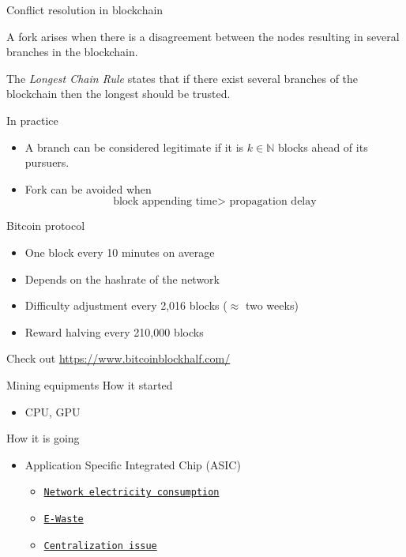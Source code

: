 \documentclass{beamer}
\begin{document}
\begin{frame}{Conflict resolution in blockchain}
\begin{tcolorbox}[enhanced,drop shadow, title=Fork]
    A fork arises when there is a disagreement between the nodes resulting in several branches in the blockchain.
\end{tcolorbox}
\begin{tcolorbox}[enhanced,drop shadow, title=LCR]
    The \textit{Longest Chain Rule} states that if there exist several branches of the blockchain then the longest should be trusted.
\end{tcolorbox}
In practice 
\begin{itemize}
  \item A branch can be considered legitimate if it is $k\in\mathbb{N}$ blocks ahead of its pursuers.
  \item Fork can be avoided when
  $$
  \text{block appending time}> \text{ propagation delay} 
  $$
\end{itemize}
\end{frame}
\begin{frame}{Bitcoin protocol}
\begin{itemize}
  \item One block every 10 minutes on average
  \item Depends on the hashrate of the network
  \item Difficulty adjustment every 2,016 blocks ($\approx$ two weeks)
  \item Reward halving every 210,000 blocks
\end{itemize}
Check out \url{https://www.bitcoinblockhalf.com/}
\end{frame}
\begin{frame}{Mining equipments}
How it started
\begin{itemize}
  \item CPU, GPU
\end{itemize}
How it is going
\begin{itemize}
  \item Application Specific Integrated Chip (ASIC)
  \begin{itemize}
  \item  \href{https://digiconomist.net/bitcoin-energy-consumption}{\texttt{Network electricity consumption}}
  \item  \href{https://www.bitmain.com/}{\texttt{E-Waste}}
  \item \href{https://mempool.space/graphs/mining/pools}{\texttt{Centralization issue}}
  \end{itemize}
\end{itemize}
\end{frame}
\end{document}
